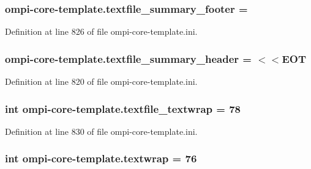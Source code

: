 \hypertarget{namespaceompi-core-template_acf20df1e068351b14bc28af7c43a8f7f}{
\subsubsection[{textfile\-\_\-summary\-\_\-footer}]{\setlength{\rightskip}{0pt plus 5cm}ompi-\/core-\/template.\-textfile\-\_\-summary\-\_\-footer =}}\label{namespaceompi-core-template_acf20df1e068351b14bc28af7c43a8f7f}


Definition at line 826 of file ompi-\/core-\/template.\-ini.

\hypertarget{namespaceompi-core-template_a6cdf17cd6bf9baaf6c41f028ebd3e13c}{
\subsubsection[{textfile\-\_\-summary\-\_\-header}]{\setlength{\rightskip}{0pt plus 5cm}ompi-\/core-\/template.\-textfile\-\_\-summary\-\_\-header = $<$$<$E\-O\-T}}\label{namespaceompi-core-template_a6cdf17cd6bf9baaf6c41f028ebd3e13c}


Definition at line 820 of file ompi-\/core-\/template.\-ini.

\hypertarget{namespaceompi-core-template_a313e5a2e3d06c1ca2f49afc51f54b664}{
\subsubsection[{textfile\-\_\-textwrap}]{\setlength{\rightskip}{0pt plus 5cm}int ompi-\/core-\/template.\-textfile\-\_\-textwrap = 78}}\label{namespaceompi-core-template_a313e5a2e3d06c1ca2f49afc51f54b664}


Definition at line 830 of file ompi-\/core-\/template.\-ini.

\hypertarget{namespaceompi-core-template_aeb49f8ad6e70070ee42d28d172cf2055}{
\subsubsection[{textwrap}]{\setlength{\rightskip}{0pt plus 5cm}int ompi-\/core-\/template.\-textwrap = 76}}\label{namespaceompi-core-template_aeb49f8ad6e70070ee42d28d172cf2055}


